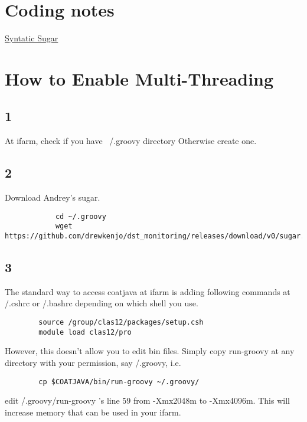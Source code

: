  \section{Coding notes}
\href{https://github.com/drewkenjo/dst_monitoring/wiki/Syntactic-sugar}{Syntatic Sugar}


\section{How to Enable Multi-Threading}

    \subsection{1}
        At ifarm, check if you have ~/.groovy  directory
        Otherwise create one.

    \subsection{2}
        Download Andrey’s sugar.
        
        \begin{lstlisting}
            cd ~/.groovy
            wget https://github.com/drewkenjo/dst_monitoring/releases/download/v0/sugar.jar
        \end{lstlisting}


    \subsection{3}
        The standard way to access coatjava at ifarm is adding following commands at \comtilde/.cshrc or \comtilde/.bashrc depending on which shell you use.
        
        \begin{lstlisting}
        source /group/clas12/packages/setup.csh
        module load clas12/pro
        \end{lstlisting}
        
        However, this doesn’t allow you to edit bin files.
        Simply copy run-groovy at any directory with your permission, say \comtilde/.groovy, i.e.
        
        \begin{lstlisting}
        cp $COATJAVA/bin/run-groovy ~/.groovy/
        \end{lstlisting}
        
        edit \comtilde/.groovy/run-groovy ’s line 59 from -Xmx2048m to -Xmx4096m. This will increase memory that can be used in your ifarm.
        
